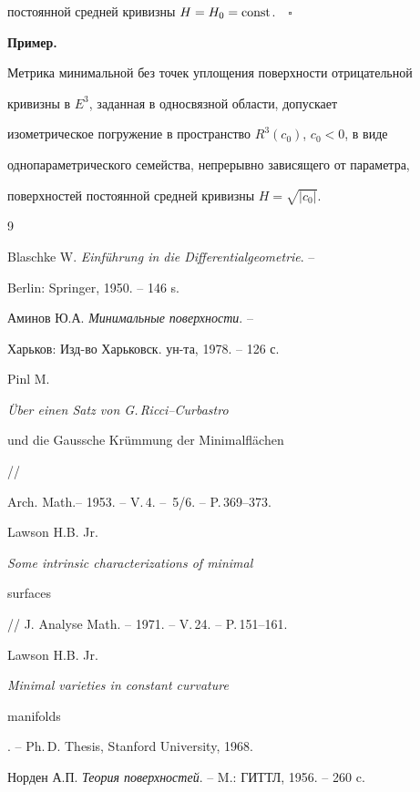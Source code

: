 постоянной средней кривизны $H=H_0=\operatorname{const}$.$\quad\square$ 


\medskip 


 


{\bf Пример.} 


Метрика минимальной без точек уплощения поверхности отрицательной 


кривизны в $E^3$, заданная в односвязной области, допускает 


изометрическое погружение в пространство $R^3(c_0)$, $c_0<0$, в виде 


однопараметрического семейства, непрерывно зависящего от параметра, 


поверхностей постоянной средней кривизны $H=\sqrt{|c_0|}$. 


 


 


\begin{thebibliography}{9} 


 




Blaschke W. {\em Einf\"uhrung in die Differentialgeometrie}. -- 


Berlin: Springer, 1950. -- 146 s.




Аминов Ю.А. {\em Минимальные поверхности}. -- 


Харьков: Изд-во Харьковск. ун-та, 1978. -- 126 с.




Pinl M. {\em \"Uber einen Satz von G.\,Ricci--Curbastro 


und die Gaussche Kr\"ummung der Minimalfl\"achen} // 


Arch. Math.-- 1953. -- V.\,4. -- \No\,5/6. -- P.\,369--373. 




Lawson H.B. Jr. {\em Some intrinsic characterizations of minimal 


surfaces} // J. Analyse Math. -- 1971. -- V.\,24. -- P.\,151--161. 




Lawson H.B. Jr. {\em Minimal varieties in constant curvature 


manifolds}. -- Ph.\,D. Thesis, Stanford University, 1968. 




Норден А.П. {\em Теория поверхностей}. -- M.: ГИТТЛ, 1956. -- 260 c. 


 


\end{thebibliography} 


 


\vskip 2cm 


 






 


\label{end} 


 


 


 


